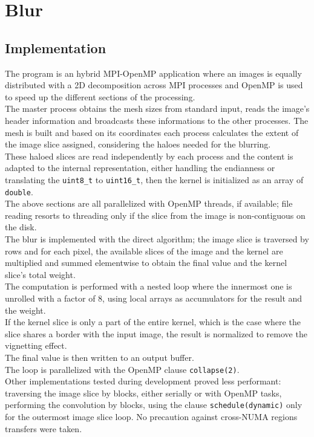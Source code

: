 \documentclass[a4paper, 11pt]{article}
\begin{document}
\section{Blur}

\subsection{Implementation}
The program is an hybrid MPI-OpenMP application where an images is equally distributed with a 2D decomposition across MPI processes and OpenMP is used to speed up the different sections of the processing.\\
The master process obtains the mesh sizes from standard input, reads the image's header information and broadcasts these informations to the other processes. The mesh is built and based on its coordinates each process calculates the extent of the image slice assigned, considering the haloes needed for the blurring.\\
These haloed slices are read independently by each process and the content is adapted to the internal representation, either handling the endianness or translating the \texttt{uint8\_t} to \texttt{uint16\_t}, then the kernel is initialized as an array of \texttt{double}.\\
The above sections are all parallelized with OpenMP threads, if available; file reading resorts to threading only if the slice from the image is non-contiguous on the disk.\\
The blur is implemented with the direct algorithm; the image slice is traversed by rows and for each pixel, the available slices of the image and the kernel are multiplied and summed elementwise to obtain the final value and the kernel slice's total weight.\\
The computation is performed with a nested loop where the innermost one is unrolled with a factor of 8, using local arrays as accumulators for the result and the weight.\\
If the kernel slice is only a part of the entire kernel, which is the case where the slice shares a border with the input image, the result is normalized to remove the vignetting effect.\\
The final value is then written to an output buffer.\\
The loop is parallelized with the OpenMP clause \texttt{collapse(2)}.\\
Other implementations tested during development proved less performant: traversing the image slice by blocks, either serially or with OpenMP tasks, performing the convolution by blocks, using the clause \texttt{schedule(dynamic)} only for the outermost image slice loop. No precaution against cross-NUMA regions transfers were taken.\\
\end{document}
